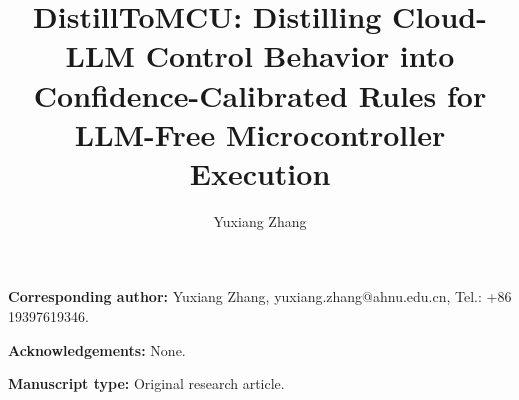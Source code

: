 \documentclass{elsarticle}
\begin{document}
\begin{frontmatter}

\title{DistillToMCU: Distilling Cloud-LLM Control Behavior into
Confidence-Calibrated Rules for LLM-Free Microcontroller Execution}

\author[1]{Yuxiang Zhang}

\end{frontmatter}

\noindent\textbf{Corresponding author:} Yuxiang Zhang,
yuxiang.zhang@ahnu.edu.cn,
Tel.: +86 19397619346.

\vspace{1em}

\noindent\textbf{Acknowledgements:} None.

\vspace{1em}

\noindent\textbf{Manuscript type:} Original research article.
\end{document}
